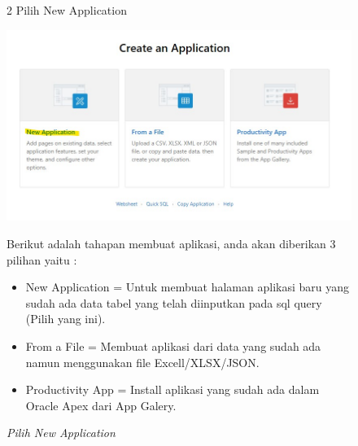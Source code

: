 \begin{itemize}
        \begin{figure}[!htbp]
        \item[2]Pilih New Application 
        \begin{center}
        \includegraphics[scale=0.5]{figures/create_a_new_application.jpg}
        \caption{\textit{Pilih New Application}}
        \end{center}
        \par Berikut adalah tahapan membuat aplikasi, anda akan diberikan 3 pilihan yaitu :
            \begin{itemize}
                \item New Application = Untuk membuat halaman aplikasi baru yang sudah ada data tabel yang telah diinputkan pada sql query (Pilih yang ini).
                \item From a File = Membuat aplikasi dari data yang sudah ada namun menggunakan file Excell/XLSX/JSON.
                \item Productivity App = Install aplikasi yang sudah ada dalam Oracle Apex dari App Galery.
            \end{itemize}
        \end{figure}
        

\end{itemize}
